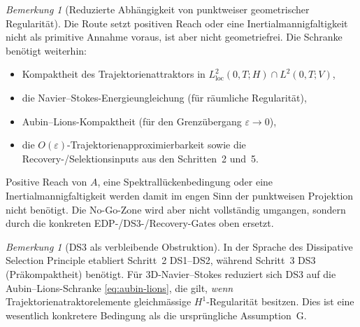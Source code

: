 \documentclass[12pt,a4paper]{article}
\theoremstyle{definition}
\theoremstyle{plain}
\theoremstyle{remark}
\newtheorem{remark}[definition]{Bemerkung}
\begin{document}
\begin{remark}[Reduzierte Abhängigkeit von punktweiser geometrischer Regularit\"at]\label{rem:no-reach-needed}
Die Route setzt positiven Reach oder eine Inertialmannigfaltigkeit nicht als primitive Annahme voraus, ist aber nicht geometriefrei. Die Schranke benötigt weiterhin:
\begin{itemize}
\item Kompaktheit des Trajektorienattraktors in $L^2_{\mathrm{loc}}(0,T;H) \cap L^2(0,T;V)$,
\item die Navier--Stokes-Energieungleichung (f\"ur r\"aumliche Regularit\"at),
\item Aubin--Lions-Kompaktheit (f\"ur den Grenz\"ubergang $\varepsilon \to 0$),
\item die $O(\varepsilon)$-Trajektorienapproximierbarkeit sowie die Recovery-/Selektionsinputs aus den Schritten~2 und~5.
\end{itemize}
Positive Reach von $A$, eine Spektrallückenbedingung oder eine Inertialmannigfaltigkeit werden damit im engen Sinn der punktweisen Projektion nicht benötigt. Die No-Go-Zone wird aber nicht vollständig umgangen, sondern durch die konkreten EDP-/DS3-/Recovery-Gates oben ersetzt.
\end{remark}

\begin{remark}[DS3 als verbleibende Obstruktion]\label{rem:ds3-ns}
In der Sprache des Dissipative Selection Principle \cite{FST-Unified2026} etabliert Schritt~2 DS1--DS2, w\"ahrend Schritt~3 DS3 (Pr\"akompaktheit) ben\"otigt. F\"ur 3D-Navier--Stokes reduziert sich DS3 auf die Aubin--Lions-Schranke \eqref{eq:aubin-lions}, die gilt, \emph{wenn} Trajektorienatraktorelemente gleichm\"assige $H^1$-Regularit\"at besitzen. Dies ist eine wesentlich konkretere Bedingung als die urspr\"ungliche Assumption~G.
\end{remark}
\end{document}
